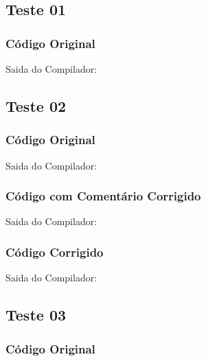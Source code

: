 \subsection{Teste 01}
\label{subsec:lexicoTeste01}

\subsubsection{Código Original}


Saida do Compilador:


\subsection{Teste 02}
\label{subsec:lexicoTeste02}

\subsubsection{Código Original}


Saida do Compilador:




\subsubsection{Código com Comentário Corrigido}


Saida do Compilador:




\subsubsection{Código Corrigido}


Saida do Compilador:




\subsection{Teste 03}
\label{subsec:lexicoTeste03}

\subsubsection{Código Original}


